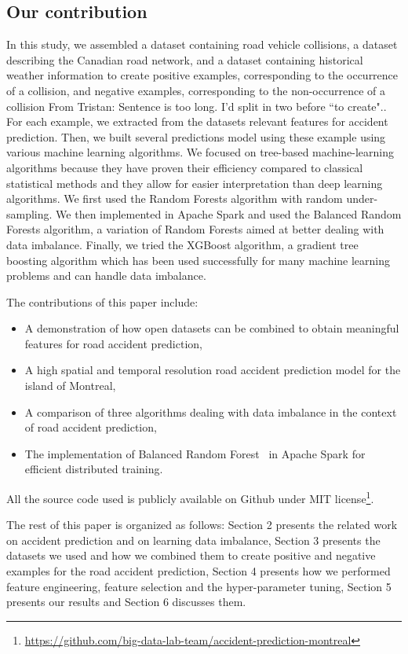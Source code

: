 \documentclass[conference]{IEEEtran}
\newcommand{\TG}[1]{\colorlet{saved}{.}\color{orange}From Tristan: #1\color{saved}}
\begin{document}
\subsection{Our contribution}

In this study, we assembled a dataset containing road vehicle collisions, a dataset describing the Canadian road network, and a dataset containing historical weather information to create positive examples, corresponding to the occurrence of a collision, and negative examples, corresponding to the non-occurrence of a collision \TG{Sentence is too long. I'd split in two before ``to create".}. For each example, we extracted from the datasets relevant features for accident prediction. Then, we built several predictions model using these example using various machine learning algorithms. We focused on tree-based machine-learning algorithms because they have proven their efficiency compared to classical statistical methods \cite{Chang2005, Chang2005b} and they allow for easier interpretation than deep learning algorithms. We first used the Random Forests algorithm with random under-sampling. We then implemented in Apache Spark and used the Balanced Random Forests algorithm\cite{Chen2004}, a variation of Random Forests aimed at better dealing with data imbalance. Finally, we  tried the XGBoost algorithm, a gradient tree boosting algorithm which has been used successfully for many machine learning problems and can handle data imbalance\cite{xgboost_doc}.

The contributions of this paper include: 
\begin{itemize}
\item A demonstration of how open datasets can be combined to obtain
meaningful features for road accident prediction,
\item A high spatial and temporal resolution road accident prediction model for the island of Montreal,
\item A comparison of three algorithms dealing with data imbalance in the context of road accident prediction,
\item The implementation of Balanced Random Forest~\cite{Chen2004} in Apache Spark for efficient distributed training.
\end{itemize}

All the source code used is publicly available on Github under MIT
license\footnote{\url{https://github.com/big-data-lab-team/accident-prediction-montreal}}.

The rest of this paper is organized as follows: Section 2 presents
the related work on accident prediction and on learning data imbalance, Section 3 presents the datasets we used and
how we combined them to create positive and negative examples for the road
accident prediction, Section 4 presents how we performed feature
engineering, feature selection and the hyper-parameter tuning, Section 5
presents our results and Section 6 discusses them.
\end{document}
